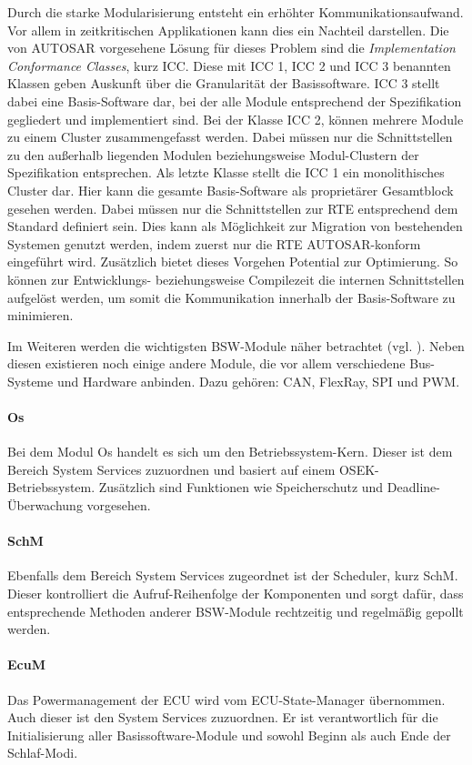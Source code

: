 \documentclass[
  a4paper,					    %
  twoside,
  DIV=calc,     				%
  bibliography=totoc,
  cleardoublepage=empty,
  ngerman,     					%
  final       					%
]{scrbook}
\begin{document}
Durch die starke Modularisierung entsteht ein erhöhter Kommunikationsaufwand. Vor allem in zeitkritischen Applikationen kann dies ein Nachteil darstellen. Die von AUTOSAR vorgesehene Lösung für dieses Problem sind die \emph{Implementation Conformance Classes}, kurz ICC. Diese mit ICC 1, ICC 2 und ICC 3 benannten Klassen geben Auskunft über die Granularität der Basissoftware. ICC 3 stellt dabei eine Basis-Software dar, bei der alle Module entsprechend der Spezifikation gegliedert und implementiert sind. Bei der Klasse ICC 2, können mehrere Module zu einem Cluster zusammengefasst werden. Dabei müssen nur die Schnittstellen zu den außerhalb liegenden Modulen beziehungsweise Modul-Clustern der Spezifikation entsprechen. Als letzte Klasse stellt die ICC 1 ein monolithisches Cluster dar. Hier kann die gesamte Basis-Software als proprietärer Gesamtblock gesehen werden. Dabei müssen nur die Schnittstellen zur RTE entsprechend dem Standard definiert sein. Dies kann als Möglichkeit zur Migration von bestehenden Systemen genutzt werden, indem zuerst nur die RTE AUTOSAR-konform eingeführt wird. Zusätzlich bietet dieses Vorgehen Potential zur Optimierung. So können zur Entwicklungs- beziehungsweise Compilezeit die internen Schnittstellen aufgelöst werden, um somit die Kommunikation innerhalb der Basis-Software zu minimieren.

Im Weiteren werden die wichtigsten BSW-Module näher betrachtet (vgl. \cite{SE_Autosar}). Neben diesen existieren noch einige andere Module, die vor allem verschiedene Bus-Systeme und Hardware anbinden. Dazu gehören: CAN, FlexRay, SPI und PWM.

\paragraph{Os}
Bei dem Modul Os handelt es sich um den Betriebssystem-Kern. Dieser ist dem Bereich System Services zuzuordnen und basiert auf einem OSEK-Betriebssystem. Zusätzlich sind Funktionen wie Speicherschutz und Deadline-Überwachung vorgesehen.

\paragraph{SchM}
Ebenfalls dem Bereich System Services zugeordnet ist der Scheduler, kurz SchM. Dieser kontrolliert die Aufruf-Reihenfolge der Komponenten und sorgt dafür, dass entsprechende Methoden anderer BSW-Module rechtzeitig und regelmäßig gepollt werden.

\paragraph{EcuM}
Das Powermanagement der ECU wird vom ECU-State-Manager übernommen. Auch dieser ist den System Services zuzuordnen. Er ist verantwortlich für die Initialisierung aller Basissoftware-Module und sowohl Beginn als auch Ende der Schlaf-Modi.
\end{document}
